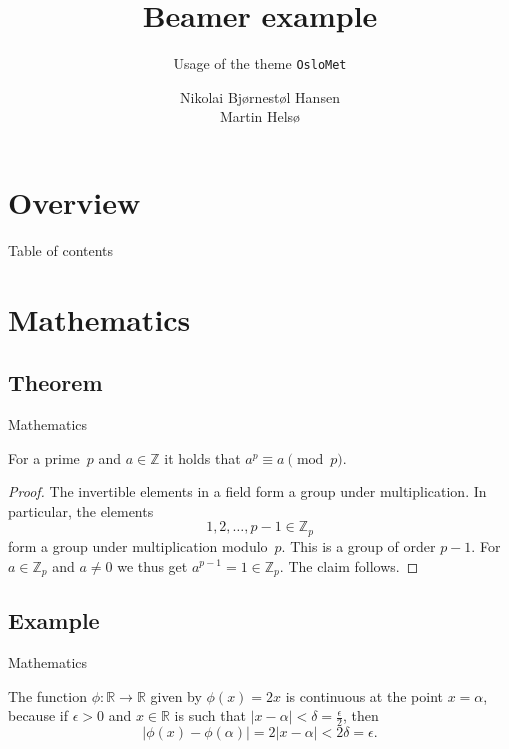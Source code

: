 \documentclass[UKenglish, aspectratio = 169]{beamer}
\author[Hansen \& Helsø]
{Nikolai Bjørnestøl Hansen \texorpdfstring{\\}{} Martin Helsø}
\title{Beamer example}
\subtitle{Usage of the theme \texttt{OsloMet}}
\begin{document}
\section{Overview}
%
%
\begin{frame}{Table of contents}
    \tableofcontents
\end{frame}

\section{Mathematics}
\subsection{Theorem}


\hidelogo

\begin{frame}{Mathematics}

    \begin{theorem}
        For a prime~\(p\) and \(a \in \mathbb{Z}\) it holds that \(a^p \equiv a \pmod{p}\).
    \end{theorem}

    \begin{proof}
        The invertible elements in a field form a group under multiplication.
        In particular, the elements
        \begin{equation*}
            1, 2, \ldots, p - 1 \in \mathbb{Z}_p
        \end{equation*}
        form a group under multiplication modulo~\(p\).
        This is a group of order \(p - 1\).
        For \(a \in \mathbb{Z}_p\) and \(a \neq 0\) we thus get \(a^{p-1} = 1 \in \mathbb{Z}_p\).
        The claim follows.
    \end{proof}
\end{frame}

\showlogo

\subsection{Example}

\begin{frame}{Mathematics}

    \begin{example}
        The function \(\phi \colon \mathbb{R} \to \mathbb{R}\) given by \(\phi(x) = 2x\) is continuous at the point \(x = \alpha\),
        because if \(\epsilon > 0\) and \(x \in \mathbb{R}\) is such that \(\lvert x - \alpha \rvert < \delta = \frac{\epsilon}{2}\),
        then
        \begin{equation*}
            \lvert \phi(x) - \phi(\alpha)\rvert = 2\lvert x - \alpha \rvert < 2\delta = \epsilon.
        \end{equation*}
    \end{example}
\end{frame}
\end{document}
